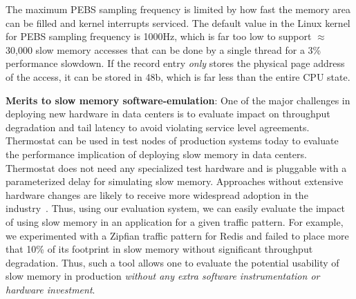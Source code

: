 The maximum PEBS sampling frequency is limited by
how fast the memory area can be filled and kernel interrupts serviced.
The default value in the Linux kernel for PEBS sampling frequency is 1000Hz, which
is far too low to support $\approx$ 30,000 slow memory accesses that can be done
by a single thread for a 3\% performance slowdown. If the record entry {\it
only} stores the physical page address of the access, it can be stored in 48b,
which is far less than the entire CPU state.


\textbf{Merits to slow memory software-emulation}: One of the major challenges
in deploying new hardware in data centers is to evaluate impact on throughput
degradation and tail latency to avoid violating service level agreements.
Thermostat can be used in test nodes of production systems today to evaluate the
performance implication of deploying slow memory in data centers.  Thermostat
does not need any specialized test hardware and is pluggable with a
parameterized delay for simulating slow memory. Approaches without extensive
hardware changes are likely to receive more widespread adoption in the
industry~\cite{ref:agarwal:hpca2016}. Thus, using our evaluation system, we can
easily evaluate the impact of using slow memory in an application for a given
traffic pattern. For example, we experimented with a Zipfian traffic pattern for
Redis and failed to place more that 10\% of its footprint in slow memory without
significant throughput degradation. Thus, such a tool allows one to evaluate the
potential usability of slow memory in production {\it without any extra software
instrumentation or hardware investment}.

%

